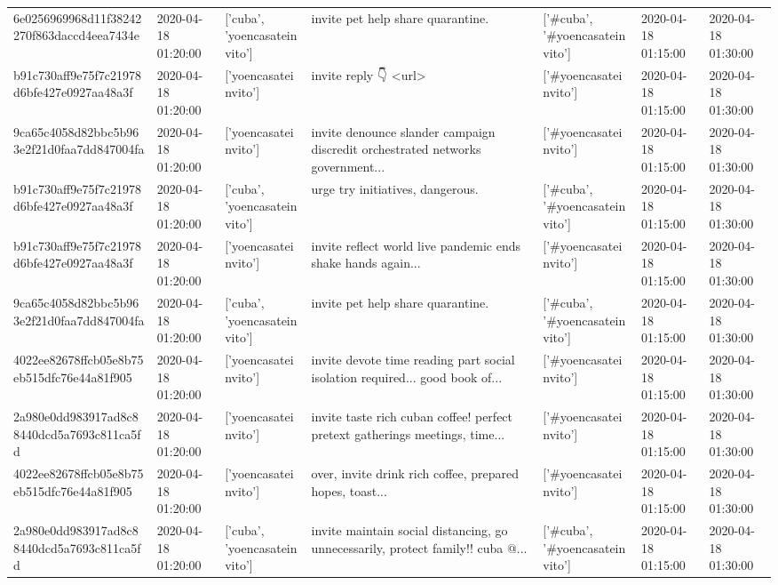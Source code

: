 \begin{tabular}{lllllll}
6e0256969968d11f38242270f863daccd4eea7434e & 2020-04-18 01:20:00 & ['cuba', 'yoencasateinvito'] & invite pet help share quarantine. & ['#cuba', '#yoencasateinvito'] & 2020-04-18 01:15:00 & 2020-04-18 01:30:00 \\
b91c730aff9e75f7c21978d6bfe427e0927aa48a3f & 2020-04-18 01:20:00 & ['yoencasateinvito'] & invite reply 👇 <url> & ['#yoencasateinvito'] & 2020-04-18 01:15:00 & 2020-04-18 01:30:00 \\
9ca65c4058d82bbc5b963e2f21d0faa7dd847004fa & 2020-04-18 01:20:00 & ['yoencasateinvito'] & invite denounce slander campaign discredit orchestrated networks government... & ['#yoencasateinvito'] & 2020-04-18 01:15:00 & 2020-04-18 01:30:00 \\
b91c730aff9e75f7c21978d6bfe427e0927aa48a3f & 2020-04-18 01:20:00 & ['cuba', 'yoencasateinvito'] & urge try initiatives, dangerous. & ['#cuba', '#yoencasateinvito'] & 2020-04-18 01:15:00 & 2020-04-18 01:30:00 \\
b91c730aff9e75f7c21978d6bfe427e0927aa48a3f & 2020-04-18 01:20:00 & ['yoencasateinvito'] & invite reflect world live pandemic ends shake hands again... & ['#yoencasateinvito'] & 2020-04-18 01:15:00 & 2020-04-18 01:30:00 \\
9ca65c4058d82bbc5b963e2f21d0faa7dd847004fa & 2020-04-18 01:20:00 & ['cuba', 'yoencasateinvito'] & invite pet help share quarantine. & ['#cuba', '#yoencasateinvito'] & 2020-04-18 01:15:00 & 2020-04-18 01:30:00 \\
4022ee82678ffcb05e8b75eb515dfc76e44a81f905 & 2020-04-18 01:20:00 & ['yoencasateinvito'] & invite devote time reading part social isolation required... good book of... & ['#yoencasateinvito'] & 2020-04-18 01:15:00 & 2020-04-18 01:30:00 \\
2a980e0dd983917ad8c88440dcd5a7693c811ca5fd & 2020-04-18 01:20:00 & ['yoencasateinvito'] & invite taste rich cuban coffee! perfect pretext gatherings meetings, time... & ['#yoencasateinvito'] & 2020-04-18 01:15:00 & 2020-04-18 01:30:00 \\
4022ee82678ffcb05e8b75eb515dfc76e44a81f905 & 2020-04-18 01:20:00 & ['yoencasateinvito'] & over, invite drink rich coffee, prepared hopes, toast... & ['#yoencasateinvito'] & 2020-04-18 01:15:00 & 2020-04-18 01:30:00 \\
2a980e0dd983917ad8c88440dcd5a7693c811ca5fd & 2020-04-18 01:20:00 & ['cuba', 'yoencasateinvito'] & invite maintain social distancing, go unnecessarily, protect family!!️ cuba @... & ['#cuba', '#yoencasateinvito'] & 2020-04-18 01:15:00 & 2020-04-18 01:30:00 \\

\end{tabular}
